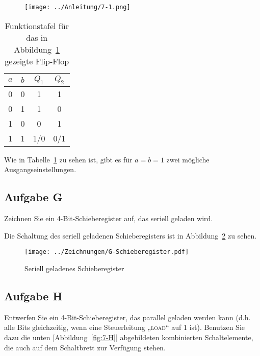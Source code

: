 \begin{figure}
    \centering
    \texttt{[image: ../Anleitung/7-1.png]}
    \caption{%
		\cite[Abbildung~7.1]{physik313-Anleitung}
    }
    \label{fig:7-1}
\end{figure}

\begin{table}
    \centering
    \begin{tabular}{cc|cc}
        $a$ & $b$ & $Q_1$ & $Q_2$ \\
        \hline
        0 & 0 & 1 & 1 \\
        0 & 1 & 1 & 0 \\
        1 & 0 & 0 & 1 \\
        1 & 1 & 1/0 & 0/1
    \end{tabular}
    \caption{%
        Funktionstafel für das in Abbildung~\ref{fig:7-1} gezeigte Flip-Flop 
    }
    \label{tab:Aufgabe_F}
\end{table}

Wie in Tabelle~\ref{tab:Aufgabe_F} zu sehen ist, gibt es für $a = b = 1$ zwei
mögliche Ausgangseinstellungen.

\FloatBarrier
\subsection{Aufgabe G}

\begin{problem}
    Zeichnen Sie ein 4-Bit-Schieberegister auf, das seriell geladen wird.
\end{problem}

Die Schaltung des seriell geladenen Schieberegisters ist in
Abbildung~\ref{fig:G-Schieberegister} zu sehen.

\begin{figure}
    \centering
    \texttt{[image: ../Zeichnungen/G-Schieberegister.pdf]}
    \caption{%
        Seriell geladenes Schieberegister
    }
    \label{fig:G-Schieberegister}
\end{figure}

\FloatBarrier
\subsection{Aufgabe H}

\begin{problem}
    Entwerfen Sie ein 4-Bit-Schieberegister, das parallel geladen werden kann
    (d.h. alle Bits gleichzeitig, wenn eine Steuerleitung „\textsc{load}“ auf 1
    ist). Benutzen Sie dazu die unten [Abbildung~\ref{fig:7-H}] abgebildeten
    kombinierten Schaltelemente, die auch auf dem Schaltbrett zur Verfügung
    stehen.
\end{problem}

